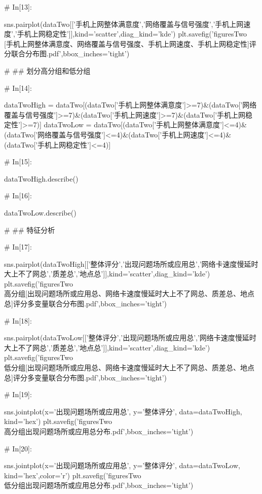 \documentclass{MathorCupmodeling}
\begin{document}
\begin{python}
# In[13]:


sns.pairplot(dataTwo[['手机上网整体满意度','网络覆盖与信号强度','手机上网速度','手机上网稳定性']],kind='scatter',diag_kind='kde')
plt.savefig('figuresTwo\\[附件2][手机上网整体满意度、网络覆盖与信号强度、手机上网速度、手机上网稳定性]评分联合分布图.pdf',bbox_inches='tight')


# ## 划分高分组和低分组

# In[14]:


dataTwoHigh = dataTwo[(dataTwo['手机上网整体满意度']>=7)&(dataTwo['网络覆盖与信号强度']>=7)&(dataTwo['手机上网速度']>=7)&(dataTwo['手机上网稳定性']>=7)]
dataTwoLow = dataTwo[(dataTwo['手机上网整体满意度']<=4)&(dataTwo['网络覆盖与信号强度']<=4)&(dataTwo['手机上网速度']<=4)&(dataTwo['手机上网稳定性']<=4)]


# In[15]:


dataTwoHigh.describe()


# In[16]:


dataTwoLow.describe()


# ## 特征分析

# In[17]:


sns.pairplot(dataTwoHigh[['整体评分','出现问题场所或应用总','网络卡速度慢延时大上不了网总','质差总','地点总']],kind='scatter',diag_kind='kde')
plt.savefig('figuresTwo\\[附件2]高分组[出现问题场所或应用总、网络卡速度慢延时大上不了网总、质差总、地点总]评分多变量联合分布图.pdf',bbox_inches='tight')


# In[18]:


sns.pairplot(dataTwoLow[['整体评分','出现问题场所或应用总','网络卡速度慢延时大上不了网总','质差总','地点总']],kind='scatter',diag_kind='kde')
plt.savefig('figuresTwo\\[附件2]低分组[出现问题场所或应用总、网络卡速度慢延时大上不了网总、质差总、地点总]评分多变量联合分布图.pdf',bbox_inches='tight')


# In[19]:


sns.jointplot(x='出现问题场所或应用总', y='整体评分', data=dataTwoHigh, kind='hex')
plt.savefig('figuresTwo\\[附件2]高分组出现问题场所或应用总分布.pdf',bbox_inches='tight')


# In[20]:


sns.jointplot(x='出现问题场所或应用总', y='整体评分', data=dataTwoLow, kind='hex',color='r')
plt.savefig('figuresTwo\\[附件2]低分组出现问题场所或应用总分布.pdf',bbox_inches='tight')



\end{python}
\end{document}
